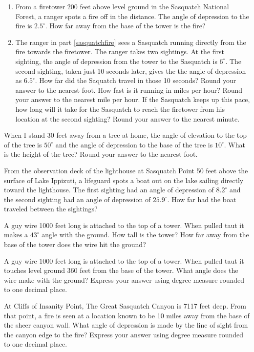 \begin{tasks}[resume]
\begin{enumerate}[label=(\alph*)]
\item \label{sasquatchfire} From a firetower 200 feet above level ground in the Sasquatch National Forest, a ranger spots a fire off in the distance.  The angle of depression to the fire is $2.5^{\circ}$.  How far away from the base of the tower is the fire?

\item  The ranger in part \ref{sasquatchfire} sees a Sasquatch running directly from the fire towards the firetower.  The ranger takes two sightings.  At the first sighting, the angle of depression from the tower to the Sasquatch is $6^{\circ}$.  The second sighting, taken just 10 seconds later, gives the the angle of depression as $6.5^{\circ}$.  How far did the Saquatch travel in those 10 seconds?  Round your answer to the nearest foot.  How fast is it running in miles per hour? Round your answer to the nearest mile per hour.  If the Sasquatch keeps up this pace, how long will it take for the Sasquatch to reach the firetower from his location at the second sighting?  Round your answer to the nearest minute.

\end{enumerate}

\task  When I stand 30 feet away from a tree at home, the angle of elevation to the top of the tree is $50^{\circ}$ and the angle of depression to the base of the tree is $10^{\circ}$.  What is the height of the tree?  Round your answer to the nearest foot.

\task From the observation deck of the lighthouse at Sasquatch Point 50 feet above the surface of Lake Ippizuti, a lifeguard spots a boat out on the lake sailing directly toward the lighthouse.  The first sighting had an angle of depression of $8.2^{\circ}$ and the second sighting had an angle of depression of $25.9^{\circ}$.  How far had the boat traveled between the sightings?

\task A guy wire 1000 feet long is attached to the top of a tower.  When pulled taut it makes a $43^{\circ}$ angle with the ground.  How tall is the tower?  How far away from the base of the tower does the wire hit the ground?

\task A guy wire 1000 feet long is attached to the top of a tower.  When pulled taut it touches level ground 360 feet from the base of the tower.  What angle does the wire make with the ground?  Express your answer using degree measure rounded to one decimal place.

\task At Cliffs of Insanity Point, The Great Sasquatch Canyon is 7117 feet deep.  From that point, a fire is seen at a location known to be 10 miles away from the base of the sheer canyon wall.  What angle of depression is made by the line of sight from the canyon edge to the fire?  Express your answer using degree measure rounded to one decimal place.


\end{tasks}
